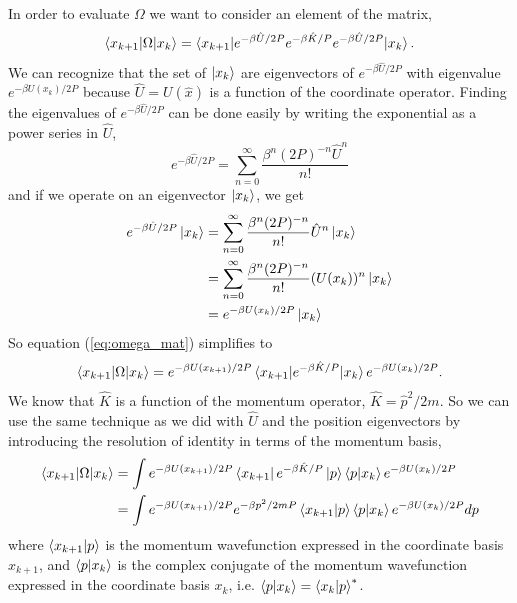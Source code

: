 \documentclass{article}
\newcommand{\be}{\begin{equation}}
\newcommand{\ee}{\end{equation}}
\begin{document}
In order to evaluate $\Omega$ we want to consider an element of the matrix,
\be \label{eq:omega_mat}
  \braket{x_{k+1}|\Omega|x_k} = \braket{x_{k+1}|e^{-\beta \hat{U}/2P} e^{-\beta \hat{K}/P} e^{-\beta \hat{U}/2P}|x_k} .
\ee
We can recognize that the set of $\ket{x_k}$ are eigenvectors of $e^{-\beta \hat{U}/2P}$ with eigenvalue $e^{-\beta U(x_k)/2P}$ because $\hat{U} = U(\hat{x})$ is a function of the coordinate operator.\cite{griffiths,shankar}
Finding the eigenvalues of $e^{-\beta \hat{U}/2P}$ can be done easily by writing the exponential as a power series in $\hat{U}$,
\be
  e^{-\beta \hat{U}/2P} = \sum_{n=0}^{\infty} \frac{\beta^n(2P)^{-n} \hat{U}^n}{n!}
\ee
and if we operate on an eigenvector $\ket{x_k}$, we get
\be
  \begin{split}
    e^{-\beta \hat{U}/2P} \ket{x_k} &= \sum_{n=0}^{\infty} \frac{\beta^n(2P)^{-n}}{n!} \hat{U}^n \ket{x_k} \\
    &= \sum_{n=0}^{\infty} \frac{\beta^n(2P)^{-n}}{n!} (U(x_k))^n \ket{x_k} \\
    &= e^{-\beta U(x_k)/2P} \ket{x_k}
  \end{split}
\ee
So equation (\ref{eq:omega_mat}) simplifies to
\be
  \braket{x_{k+1}|\Omega|x_k} = e^{-\beta U(x_{k+1})/2P} \braket{x_{k+1}|e^{-\beta \hat{K}/P} |x_k} e^{-\beta U(x_k)/2P} .
\ee
We know that $\hat{K}$ is a function of the momentum operator, $\hat{K} = \hat{p}^2/2m$. \cite{griffiths,shankar} So we can use the same technique as we did with $\hat{U}$ and the position eigenvectors by introducing the resolution of identity in terms of the momentum basis,
\be
  \begin{split}
    \braket{x_{k+1}|\Omega|x_k} &= \int e^{-\beta U(x_{k+1})/2P} \bra{x_{k+1}}e^{-\beta \hat{K}/P} \ket{p}\braket{p|x_k} e^{-\beta U(x_k)/2P} \\
    &= \int e^{-\beta U(x_{k+1})/2P} e^{-\beta p^2/2mP} \braket{x_{k+1}|p}\braket{p|x_k} e^{-\beta U(x_k)/2P} dp
  \end{split}
\ee
where $\braket{x_{k+1}|p}$ is the momentum wavefunction expressed in the coordinate basis $x_{k+1}$, and $\braket{p|x_k}$ is the complex conjugate of the momentum wavefunction expressed in the coordinate basis $x_k$, i.e. $\braket{p|x_k} = \braket{x_k|p}^*$.
\end{document}
